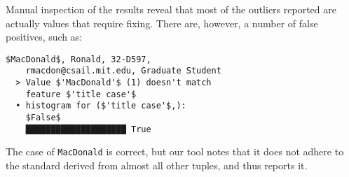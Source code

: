 Manual inspection of the results reveal that most of the outliers reported are actually values that require fixing. There are, however, a number of false positives, such as:

\begin{lstlisting}[gobble=2]
  $MacDonald$, Ronald, 32-D597, 
    rmacdon@csail.mit.edu, Graduate Student    
  > Value $'MacDonald'$ (1) doesn't match 
    feature $'title case'$  
  • histogram for ($'title case'$,):
    $False$
    ████████████████████ True
\end{lstlisting}

The case of \lstinline{MacDonald} is correct, but our tool notes that it does not adhere to the standard derived from almost all other tuples, and thus reports it. 
